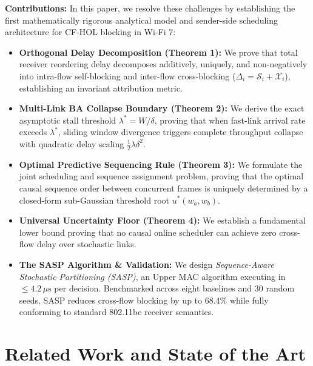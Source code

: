 \documentclass[10pt,journal,compsoc]{IEEEtran}
\begin{document}
\textbf{Contributions:} In this paper, we resolve these challenges by establishing the first mathematically rigorous analytical model and sender-side scheduling architecture for CF-HOL blocking in Wi-Fi 7:
\begin{itemize}
    \item \textbf{Orthogonal Delay Decomposition (Theorem 1):} We prove that total receiver reordering delay decomposes additively, uniquely, and non-negatively into intra-flow self-blocking and inter-flow cross-blocking ($\Delta_i = \mathcal{S}_i + \mathcal{X}_i$), establishing an invariant attribution metric.
    \item \textbf{Multi-Link BA Collapse Boundary (Theorem 2):} We derive the exact asymptotic stall threshold $\lambda^* = W / \delta$, proving that when fast-link arrival rate exceeds $\lambda^*$, sliding window divergence triggers complete throughput collapse with quadratic delay scaling $\frac{1}{2} \lambda \delta^2$.
    \item \textbf{Optimal Predictive Sequencing Rule (Theorem 3):} We formulate the joint scheduling and sequence assignment problem, proving that the optimal causal sequence order between concurrent frames is uniquely determined by a closed-form sub-Gaussian threshold root $u^*(w_a, w_b)$.
    \item \textbf{Universal Uncertainty Floor (Theorem 4):} We establish a fundamental lower bound proving that no causal online scheduler can achieve zero cross-flow delay over stochastic links.
    \item \textbf{The SASP Algorithm \& Validation:} We design \emph{Sequence-Aware Stochastic Partitioning (SASP)}, an Upper MAC algorithm executing in $\le 4.2\,\mu\text{s}$ per decision. Benchmarked across eight baselines and 30 random seeds, SASP reduces cross-flow blocking by up to 68.4\% while fully conforming to standard 802.11be receiver semantics.
\end{itemize}

\section{Related Work and State of the Art}
\label{sec:related}
\end{document}
